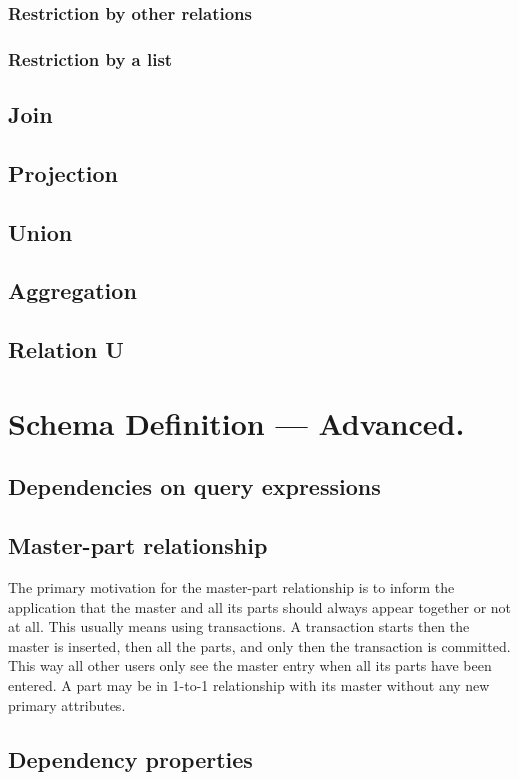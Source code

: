 \documentclass[letter,twocolumn,11pt]{article}
\begin{document}
\subsubsection{Restriction by other relations}
\subsubsection{Restriction by a list}

\subsection{Join}
\subsection{Projection}
\subsection{Union}
\subsection{Aggregation}
\subsection{Relation U}

\section{Schema Definition --- Advanced.}
\subsection{Dependencies on query expressions}
\subsection{Master-part relationship}
The primary motivation for the master-part relationship is to inform the application that the master and all its parts should always appear together or not at all.  
This usually means using transactions.  
A transaction starts then the master is inserted, then all the parts, and only then the transaction is committed.  
This way all other users only see the master entry when all its parts have been entered.
A part may be in 1-to-1 relationship with its master without any new primary attributes.
\subsection{Dependency properties}



\end{document}
